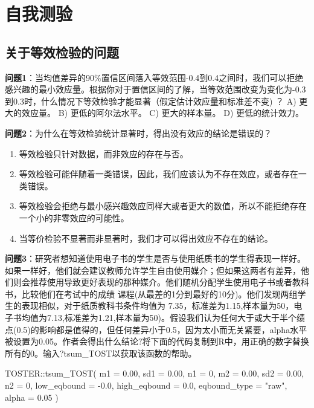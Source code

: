 \documentclass[
  letterpaper,
  DIV=11,
  numbers=noendperiod]{scrreprt}
\newenvironment{Shaded}{\begin{snugshade}}{\end{snugshade}}
\newcommand{\AttributeTok}[1]{\textcolor[rgb]{0.40,0.45,0.13}{#1}}
\newcommand{\DecValTok}[1]{\textcolor[rgb]{0.68,0.00,0.00}{#1}}
\newcommand{\FloatTok}[1]{\textcolor[rgb]{0.68,0.00,0.00}{#1}}
\newcommand{\FunctionTok}[1]{\textcolor[rgb]{0.28,0.35,0.67}{#1}}
\newcommand{\NormalTok}[1]{\textcolor[rgb]{0.00,0.23,0.31}{#1}}
\newcommand{\SpecialCharTok}[1]{\textcolor[rgb]{0.37,0.37,0.37}{#1}}
\newcommand{\StringTok}[1]{\textcolor[rgb]{0.13,0.47,0.30}{#1}}
\providecommand{\tightlist}{%
  \setlength{\itemsep}{0pt}\setlength{\parskip}{0pt}}\usepackage{longtable,booktabs,array}
\begin{document}
\hypertarget{ux81eaux6211ux6d4bux9a8c}{%
\section{自我测验}\label{ux81eaux6211ux6d4bux9a8c}}

\hypertarget{ux5173ux4e8eux7b49ux6548ux68c0ux9a8cux7684ux95eeux9898}{%
\subsection{关于等效检验的问题}\label{ux5173ux4e8eux7b49ux6548ux68c0ux9a8cux7684ux95eeux9898}}

\textbf{问题1}：当均值差异的90\%置信区间落入等效范围-0.4到0.4之间时，我们可以拒绝感兴趣的最小效应量。根据你对于置信区间的了解，当等效范围改变为变化为-0.3到0.3时，什么情况下等效检验才能显著（假定估计效应量和标准差不变)
？ A) 更大的效应量。 B) 更低的阿尔法水平。 C) 更大的样本量。 D)
更低的统计效力。

\textbf{问题2}：为什么在等效检验统计显著时，得出没有效应的结论是错误的？

\begin{enumerate}
\def\labelenumi{\Alph{enumi})}
\tightlist
\item
  等效检验只针对数据，而非效应的存在与否。
\item
  等效检验可能伴随着一类错误，因此，我们应该认为不存在效应，或者存在一类错误。
\item
  等效检验会拒绝与最小感兴趣效应同样大或者更大的数值，所以不能拒绝存在一个小的非零效应的可能性。
\item
  当等价检验不显著而非显著时，我们才可以得出效应不存在的结论。
\end{enumerate}

\textbf{问题3}：研究者想知道使用电子书的学生是否与使用纸质书的学生得表现一样好。如果一样好，他们就会建议教师允许学生自由使用媒介；但如果这两者有差异，他们则会推荐使用导致更好表现的那种媒介。他们随机分配学生使用电子书或者教科书，比较他们在考试中的成绩
课程(从最差的1分到最好的10分)。他们发现两组学生的表现相似，对于纸质教科书条件均值为
7.35，标准差为1.15,样本量为50，电子书均值为7.13,标准差为1.21,样本量为50)。假设我们认为任何大于或大于半个绩点(0.5)的影响都是值得的，但任何差异小于0.5，因为太小而无关紧要，alpha水平被设置为0.05。作者会得出什么结论?将下面的代码复制到R中，用正确的数字替换所有的0。输入?tsum\_TOST以获取该函数的帮助。

\begin{Shaded}
\begin{Highlighting}[]
\NormalTok{TOSTER}\SpecialCharTok{::}\FunctionTok{tsum\_TOST}\NormalTok{(}
  \AttributeTok{m1 =} \FloatTok{0.00}\NormalTok{,}
  \AttributeTok{sd1 =} \FloatTok{0.00}\NormalTok{,}
  \AttributeTok{n1 =} \DecValTok{0}\NormalTok{,}
  \AttributeTok{m2 =} \FloatTok{0.00}\NormalTok{,}
  \AttributeTok{sd2 =} \FloatTok{0.00}\NormalTok{,}
  \AttributeTok{n2 =} \DecValTok{0}\NormalTok{,}
  \AttributeTok{low\_eqbound =} \SpecialCharTok{{-}}\FloatTok{0.0}\NormalTok{,}
  \AttributeTok{high\_eqbound =} \FloatTok{0.0}\NormalTok{,}
  \AttributeTok{eqbound\_type =} \StringTok{"raw"}\NormalTok{,}
  \AttributeTok{alpha =} \FloatTok{0.05}
\NormalTok{)}
\end{Highlighting}
\end{Shaded}
\end{document}
